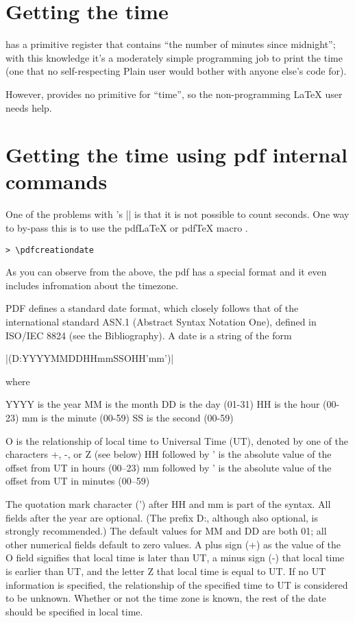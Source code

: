\section{Getting the time}

\tex has a primitive register that contains “the number of minutes since midnight”; with this knowledge it’s a moderately simple programming job to print the time (one that no self-respecting Plain \tex user would bother with anyone else’s code for).

However, \latex provides no primitive for “time”, so the non-programming LaTeX user needs help.


\section*{Getting the time using pdf internal commands}

One of the problems with \tex's |\time| is that it is not possible to count seconds. One way to by-pass this is to use the pdfLaTeX or pdfTeX macro
.


\texttt{> \textbackslash pdfcreationdate}

\texttt{\pdfcreationdate}

As you can observe from the above, the pdf has a special format and it even includes infromation about the timezone.

PDF defines a standard date format, which closely follows that of the international standard ASN.1 (Abstract Syntax Notation One), defined in ISO/IEC 8824 (see the Bibliography). A date is a string of the form

|(D:YYYYMMDDHHmmSSOHH'mm')|

where

\begin{teX}
YYYY is the year
MM is the month
DD is the day (01-31)
HH is the hour (00-23)
mm is the minute (00-59)
SS is the second (00-59)
\end{teX}


O is the relationship of local time to Universal Time (UT), denoted by one of the characters +, -, or Z (see below)
HH followed by ' is the absolute value of the offset from UT in hours (00–23)
mm followed by ' is the absolute value of the offset from UT in minutes (00–59)

The quotation mark character (') after HH and mm is part of the syntax. All fields after the year are optional. (The prefix D:, although also optional, is strongly recommended.) The default values for MM and DD are both 01; all other numerical fields default to zero values. A plus sign (+) as the value of the O field signifies that local time is later than UT, a minus sign (-) that local time is earlier than UT, and the letter Z that local time is equal to UT. If no UT information is specified, the relationship of the specified time to UT is considered to be unknown. Whether or not the time zone is known, the rest of the date should be specified in local time.

